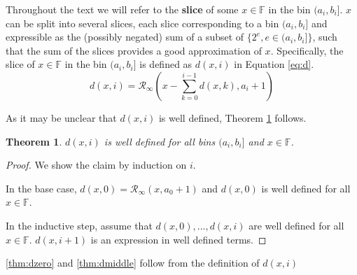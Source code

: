 \documentclass[12pt]{article}
\providecommand{\F}{\ensuremath{\mathbb{F}}}
\providecommand{\roundtonearestinfty}{\ensuremath{\mathcal{R}_\text{$\infty$}}}
\theoremstyle{plain}
\newtheorem{thm}{Theorem}[section]
\numberwithin{equation}{section}
\begin{document}
    Throughout the text we will refer to the \textbf{slice} of some $x \in \F$ in the bin $(a_i, b_i]$. $x$ can be split into several slices, each slice corresponding to a bin $(a_i, b_i]$ and expressible as the (possibly negated) sum of a subset of $\{2^e, e \in (a_i, b_i]\}$, such that the sum of the slices provides a good approximation of $x$. Specifically, the slice of $x \in \F$ in the bin $(a_i, b_i]$ is defined as $d(x, i)$ in Equation \ref{eq:d}.
    \begin{equation}
      d(x, i) = \roundtonearestinfty(x - \sum\limits_{k=0}^{i - 1}d(x,k), a_i + 1)
      \label{eq:d}
    \end{equation}

    As it may be unclear that $d(x, i)$ is well defined, Theorem \ref{thm:ddefined} follows.
    \begin{thm}
      $d(x, i)$ is well defined for all bins $(a_i, b_i]$ and $x \in \F$.
      \label{thm:ddefined}
    \end{thm}
    \begin{proof}
      We show the claim by induction on $i$.

      In the base case, $d(x, 0) = \roundtonearestinfty(x, a_0 + 1)$ and $d(x, 0)$ is well defined for all $x \in \F$.

      In the inductive step, assume that $d(x, 0), ..., d(x, i)$ are well defined for all $x \in \F$. $d(x, i + 1)$ is an expression in well defined terms.
    \end{proof}

    \ref{thm:dzero} and \ref{thm:dmiddle} follow from the definition of $d(x, i)$
\end{document}

